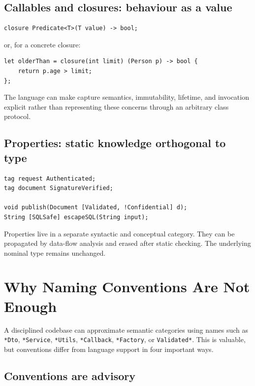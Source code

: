 \documentclass[11pt]{article}
\begin{document}
\subsection{Callables and closures: behaviour as a value}

\begin{lstlisting}
closure Predicate<T>(T value) -> bool;
\end{lstlisting}

or, for a concrete closure:

\begin{lstlisting}
let olderThan = closure(int limit) (Person p) -> bool {
    return p.age > limit;
};
\end{lstlisting}

The language can make capture semantics, immutability, lifetime, and invocation explicit rather than representing these concerns through an arbitrary class protocol.

\subsection{Properties: static knowledge orthogonal to type}

\begin{lstlisting}
tag request Authenticated;
tag document SignatureVerified;

void publish(Document [Validated, !Confidential] d);
String [SQLSafe] escapeSQL(String input);
\end{lstlisting}

Properties live in a separate syntactic and conceptual category. They can be propagated by data-flow analysis and erased after static checking. The underlying nominal type remains unchanged.

\section{Why Naming Conventions Are Not Enough}

A disciplined codebase can approximate semantic categories using names such as \texttt{*Dto}, \texttt{*Service}, \texttt{*Utils}, \texttt{*Callback}, \texttt{*Factory}, or \texttt{Validated*}. This is valuable, but conventions differ from language support in four important ways.

\subsection{Conventions are advisory}
\end{document}

